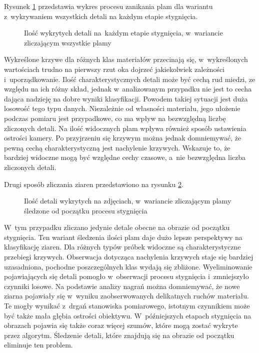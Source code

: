 Rysunek \ref{fig:blobchartall} przedstawia wykres procesu zanikania plam dla
wariantu z~wykrywaniem wszystkich detali na każdym etapie stygnięcia.
\begin{figure}[htbp]
    \centering
    
    \caption{Ilość wykrytych detali na~każdym etapie stygnięcia, w~wariancie
             zliczającym wszystkie plamy}
    \label{fig:blobchartall}
\end{figure}
Wykreślone krzywe dla różnych klas materiałów przecinają się, w~wykreślonych
wartościach trudno na pierwszy rzut oka dojrzeć jakiekolwiek zależności
i~uporządkowanie.
Ilość charakterystycznych detali może być cechą rud miedzi, ze względu na
ich różny skład, jednak w~analizowanym przypadku nie jest to cecha dająca
nadzieję na dobre wyniki klasyfikacji.
Powodem takiej sytuacji jest duża losowość tego typu danych.
Niezależnie od własności materiału, jego ułożenie podczas pomiaru jest
przypadkowe, co ma wpływ na bezwzględną liczbę zliczonych detali.
Na ilość widocznych plam wpływa również sposób ustawienia ostrości kamery.
Po przyjrzeniu się krzywym można jednak domniemywać, że pewną cechą
charakterystyczną jest nachylenie krzywych.
Wskazuje to, że bardziej widoczne mogą być względne cechy czasowe, a~nie
bezwzględna liczba zliczonych detali.

Drugi sposób zliczania ziaren przedstawiono na rysunku \ref{fig:blobchartrem}.
\begin{figure}[htbp]
    \centering
    
    \caption{Ilość detali wykrytych na zdjęciach, w~wariancie zliczającym
             plamy śledzone od początku procesu stygnięcia}
    \label{fig:blobchartrem}
\end{figure}
W~tym przypadku zliczano jedynie detale obecne na obrazie od początku
stygnięcia.
Ten wariant śledzenia ilości plam daje dużo lepsze perspektywy na klasyfikację
ziaren.
Dla różnych typów próbek widoczne są charakterystyczne przebiegi krzywych.
Obserwacja dotycząca nachylenia krzywych staje się bardziej uzasadniona,
pochodne poszczególnych klas wydają się zbliżone.
Wyeliminowanie pojawiających się detali pomogło w~obserwacji procesu
stygnięcia i~zmniejszyło czynniki losowe.
Na podstawie analizy nagrań można domniemywać, że nowe ziarna pojawiały
się w~wyniku zaobserwowanych delikatnych ruchów materiału.
Te mogły wynikać z~drgań stanowiska pomiarowego, istotnym czynnikiem może
być także mała głębia ostrości obiektywu.
W~późniejszych etapach stygnięcia na obrazach pojawia się także coraz więcej
szumów, które mogą zostać wykryte przez algorytm.
Śledzenie detali, które znajdują się na obrazie od początku eliminuje ten
problem.

